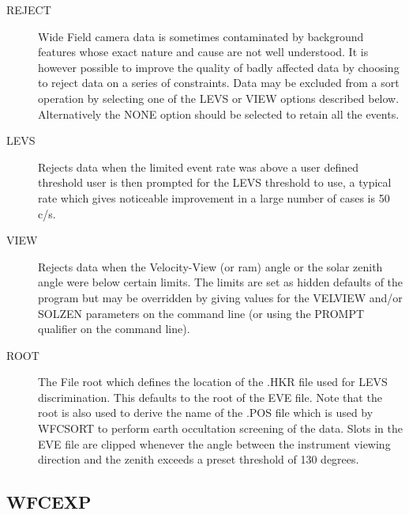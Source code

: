 \begin{description}
\item[REJECT]
Wide Field camera data is sometimes contaminated by background features
whose exact nature and cause are not well understood. It is
however possible to improve the quality of badly affected data by 
choosing to reject data on a series of constraints. Data may
be excluded from a sort operation by selecting one of the LEVS or VIEW
options described below. Alternatively the NONE option should be selected 
to retain all the events.
\item[LEVS]
Rejects data when the limited event rate was above a user defined
threshold user is then prompted for the LEVS threshold to use, a typical
rate which gives noticeable improvement in a large number of cases is
50 c/s.
\item[VIEW]
Rejects data when the Velocity-View (or ram) angle or the solar
zenith angle were below certain limits. The limits are set as hidden
defaults of the program but may be overridden by giving values for
the VELVIEW and/or SOLZEN parameters on the command line (or using the 
PROMPT qualifier on the command line).
\item[ROOT]
The File root which defines the location of the .HKR file used for
LEVS discrimination. This defaults to the root of the EVE file. Note that
the root is also used to derive the name of the .POS file which is
used by WFCSORT to perform earth occultation screening of the data. 
Slots in the EVE file are clipped whenever the angle between the 
instrument viewing direction and the zenith exceeds a preset threshold 
of 130 degrees.
\end{description}

\subsection{WFCEXP}

